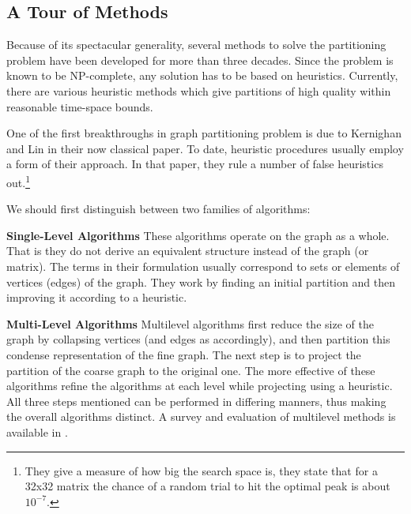 \documentclass[a4paper,12pt]{article}
\begin{document}
\subsection{A Tour of Methods}
Because of its spectacular generality, several methods to solve the
partitioning problem have been developed for more than three
decades. Since the problem is known to be NP-complete, any solution
has to be based on heuristics. Currently, there are various heuristic
methods which give partitions of high quality within reasonable
time-space bounds.\cite{gupta1} 

One of the first breakthroughs in graph partitioning problem is due
to Kernighan and Lin \cite{kl} in their now classical paper. To date,
heuristic procedures usually employ a form of their approach. In that
paper, they rule a number of false heuristics out.\footnote{They give a
measure of how big the search space is, they state that for a 32x32
matrix the chance of a random trial to hit the optimal peak is about
$10^{-7}$.}

We should first distinguish between two families of algorithms:
\begin{description}
\item{\textbf{Single-Level Algorithms}} These algorithms operate on
the graph as a whole. That is they do not derive an equivalent
structure instead of the graph (or matrix). The terms in  their
formulation usually correspond to sets or elements of vertices (edges) of the
graph. They work by finding an initial partition and then improving
it according to a heuristic.
\item{\textbf{Multi-Level Algorithms}} Multilevel algorithms first
reduce the size of the graph by collapsing vertices (and edges as
accordingly), and then partition this condense representation of the
fine graph. The next step is to project the partition of the coarse
graph to the original one. The more effective of these
algorithms refine the algorithms at each level while projecting using
a heuristic. All three steps mentioned can be performed in differing
manners, thus making the overall algorithms distinct. A survey and
evaluation of multilevel methods is available in \cite{kumar}. 
\end{description}
\end{document}
